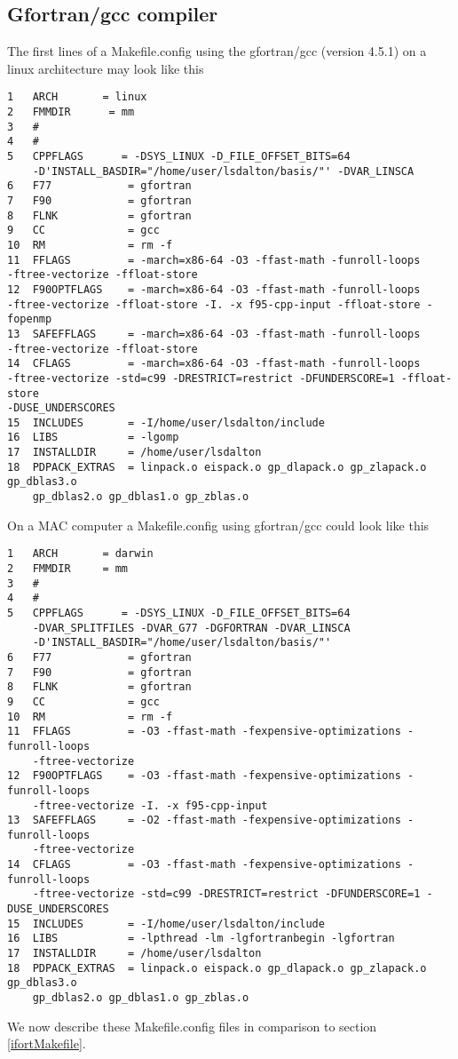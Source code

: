 \subsection{Gfortran/gcc compiler}
The first lines of a Makefile.config using the gfortran/gcc (version 4.5.1) on a linux architecture may look like this
\begin{verbatim}
1   ARCH       = linux
2   FMMDIR      = mm
3   #
4   #
5   CPPFLAGS      = -DSYS_LINUX -D_FILE_OFFSET_BITS=64
    -D'INSTALL_BASDIR="/home/user/lsdalton/basis/"' -DVAR_LINSCA
6   F77            = gfortran
7   F90            = gfortran
8   FLNK           = gfortran
9   CC             = gcc
10  RM             = rm -f
11  FFLAGS         = -march=x86-64 -O3 -ffast-math -funroll-loops 
-ftree-vectorize -ffloat-store
12  F90OPTFLAGS    = -march=x86-64 -O3 -ffast-math -funroll-loops 
-ftree-vectorize -ffloat-store -I. -x f95-cpp-input -ffloat-store -fopenmp
13  SAFEFFLAGS     = -march=x86-64 -O3 -ffast-math -funroll-loops 
-ftree-vectorize -ffloat-store
14  CFLAGS         = -march=x86-64 -O3 -ffast-math -funroll-loops 
-ftree-vectorize -std=c99 -DRESTRICT=restrict -DFUNDERSCORE=1 -ffloat-store 
-DUSE_UNDERSCORES
15  INCLUDES       = -I/home/user/lsdalton/include 
16  LIBS           = -lgomp 
17  INSTALLDIR     = /home/user/lsdalton
18  PDPACK_EXTRAS  = linpack.o eispack.o gp_dlapack.o gp_zlapack.o gp_dblas3.o 
    gp_dblas2.o gp_dblas1.o gp_zblas.o
\end{verbatim}
On a MAC computer a Makefile.config using gfortran/gcc could look like this
\begin{verbatim}
1   ARCH       = darwin
2   FMMDIR     = mm
3   #
4   #
5   CPPFLAGS      = -DSYS_LINUX -D_FILE_OFFSET_BITS=64 
    -DVAR_SPLITFILES -DVAR_G77 -DGFORTRAN -DVAR_LINSCA
    -D'INSTALL_BASDIR="/home/user/lsdalton/basis/"' 
6   F77            = gfortran
7   F90            = gfortran
8   FLNK           = gfortran
9   CC             = gcc
10  RM             = rm -f
11  FFLAGS         = -O3 -ffast-math -fexpensive-optimizations -funroll-loops 
    -ftree-vectorize
12  F90OPTFLAGS    = -O3 -ffast-math -fexpensive-optimizations -funroll-loops 
    -ftree-vectorize -I. -x f95-cpp-input
13  SAFEFFLAGS     = -O2 -ffast-math -fexpensive-optimizations -funroll-loops 
    -ftree-vectorize
14  CFLAGS         = -O3 -ffast-math -fexpensive-optimizations -funroll-loops 
    -ftree-vectorize -std=c99 -DRESTRICT=restrict -DFUNDERSCORE=1 -DUSE_UNDERSCORES
15  INCLUDES       = -I/home/user/lsdalton/include 
16  LIBS           = -lpthread -lm -lgfortranbegin -lgfortran
17  INSTALLDIR     = /home/user/lsdalton
18  PDPACK_EXTRAS  = linpack.o eispack.o gp_dlapack.o gp_zlapack.o gp_dblas3.o 
    gp_dblas2.o gp_dblas1.o gp_zblas.o
\end{verbatim}
We now describe these Makefile.config files in comparison to section \ref{ifortMakefile}.

